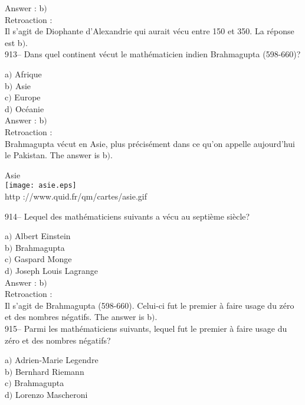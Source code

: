 ﻿\documentclass[letterpaper, 12pt]{article}
\begin{document}
Answer : b$)$\\

Retroaction :\\
Il s'agit de Diophante d'Alexandrie qui aurait v\'ecu entre 150 et 350. La
r\'eponse est b$)$.\\

913-- Dans quel continent v\'ecut le math\'ematicien indien
Brahmagupta (598-660)?

a$)$ Afrique \\
b$)$ Asie \\
c$)$ Europe \\
d$)$ Oc\'eanie  \\

Answer : b$)$\\

Retroaction : \\
Brahmagupta v\'ecut en Asie, plus pr\'ecis\'ement dans ce qu'on appelle
aujourd'hui le Pakistan. The answer is b$)$.\\

        \begin{center}
        Asie\\
    \texttt{[image: asie.eps]}\\
        {\footnotesize http ://www.quid.fr/qm/cartes/asie.gif}
    \end{center}

914-- Lequel des math\'ematiciens suivants a v\'ecu au septi\`eme
si\`ecle?

a$)$ Albert Einstein \\
b$)$ Brahmagupta \\
c$)$ Gaspard Monge \\
d$)$ Joseph Louis Lagrange\\

Answer : b$)$\\

Retroaction : \\
Il s'agit de Brahmagupta (598-660). Celui-ci fut le premier \`a faire usage
du z\'ero et des nombres n\'egatifs. The answer is b$)$.\\

915-- Parmi les math\'ematiciens suivants, lequel fut le premier \`a
faire usage du z\'ero et des nombres n\'egatifs?

a$)$ Adrien-Marie Legendre  \\
b$)$ Bernhard Riemann \\
c$)$ Brahmagupta \\
d$)$ Lorenzo Mascheroni \\
\end{document}
